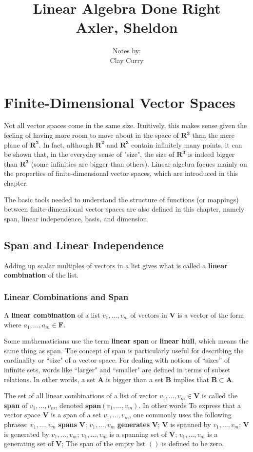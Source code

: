 \documentclass[11pt]{article} %
\title{Linear Algebra Done Right \\ Axler, Sheldon}
\author{Notes by:  \\ Clay Curry}
\date{}
\newcommand\R[1]{\mathbf{R^{#1}}}
\newcommand\F[1]{\mathbf{F^{#1}}}
\newcommand\V{\mathbf{V}}
\newcommand\lc[3]{#1_1 #2_1 + \cdots + #1_{#3} #2_{#3}}
\newcommand\ls[2]{#1_1, \ldots, #1_{#2}}
\newcommand\spann[1]{\mathbf{span}(#1)}
\newcommand\set[1]{\{#1\}}
\newcommand\0{\mathbf{0}}
\begin{document}
\section{Finite-Dimensional Vector Spaces}
Not all vector spaces come in the same size. Ituitively, this makes sense given the feeling of having more room to move about in the space of $\R{3}$ than the mere plane of $\R{2}$. In fact, although $\R{2}$ and $\R{3}$ contain infinitely many points, it can be shown that, in the everyday sense of "size", the size of $\R{3}$ is indeed bigger than $\R{2}$ (some infinities are bigger than others). Linear algebra focues mainly on the properties of finite-dimensional vector spaces, which are introduced in this chapter. 

The basic tools needed to understand the structure of functions (or mappings) between finite-dimensional vector spaces are also defined in this chapter, namely span, linear independence, basis, and dimension. 

\subsection{Span and Linear Independence}
Adding up scalar multiples of vectors in a list gives what is called a \textbf{linear combination} of the list.

\subsubsection{Linear Combinations and Span}

{
A \textbf{linear combination} of a list $\ls{v}{m}$ of vectors in $\V$ is a vector of the form
\mathdiv{\lc{a}{v}{m}}
where $\ls{a}{m} \in \F{}$.
}

Some mathematicians use the term \textbf{linear span} or \textbf{linear hull}, which means the same thing as span. The concept of span is particularly useful for describing the cardinality or ``size" of a vector space. For dealing with notions of ``sizes'' of infinite sets, words like ``larger" and ``smaller" are defined in terms of subset relations. In other words, a set $\mathbf{A}$ is bigger than a set $\mathbf{B}$ implies that $\mathbf{B \subset A}$.

{
The set of all linear combinations of a list of vector $\ls{v}{m} \in \V$ is called the \textbf{span} of $\ls{v}{m}$, denoted $\spann{\ls{v}{m}}$. In other words
\mathdiv{\spann{\ls{v}{m}} = \set{\lc{a}{v}{m} : \ls{a}{m} \in \F{}}.}
To express that a vector space $\V$ is a span of a set $\ls{v}{m}$, one commonly uses the following phrases:
\points
{$\ls{v}{m}$ \textbf{spans} $\V$;}
{$\ls{v}{m}$ \textbf{generates} $\V$;}
{$\V$ is spanned by $\ls{v}{m}$;}
{$\V$ is generated by $\ls{v}{m}$;}
{$\ls{v}{m}$ is a spanning set of $\V$;}
{$\ls{v}{m}$ is a generating set of $\V$;}
The span of the empty list $()$ is defined to be zero.
}
\end{document}
